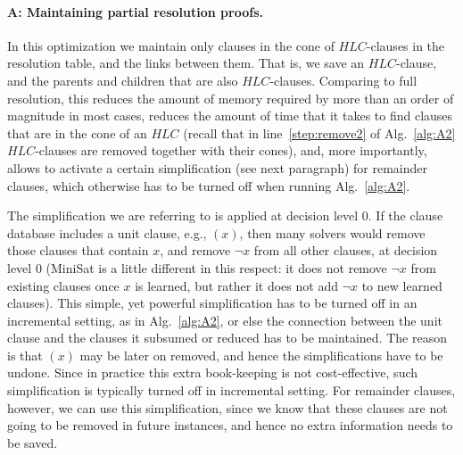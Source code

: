 \documentclass[twoside,11pt]{article}
\begin{document}
\paragraph{A: Maintaining partial resolution proofs.} In this optimization we maintain only clauses in the cone of $HLC$-clauses in the resolution table, and the links between them. That is, we save an $HLC$-clause, and the parents and children that are also $HLC$-clauses.
Comparing to full resolution, this reduces the amount of memory required by more than an order of magnitude in most cases, reduces the amount of time that it takes to find clauses that are in the cone of an $HLC$ (recall that in line~\ref{step:remove2} of Alg.~\ref{alg:A2} $HLC$-clauses are removed together with their cones), and, more importantly, allows to activate a certain simplification (see next paragraph) for remainder clauses, which otherwise has to be turned off when running Alg.~\ref{alg:A2}.

The simplification we are referring to is applied at decision level 0. If the clause database includes a unit clause, e.g., $(x)$, then
many solvers would remove those clauses that contain $x$, and remove $\lnot
x$ from all other clauses, at decision level 0 (MiniSat is a little different
in this respect: it does not remove $\lnot x$ from existing clauses once $x$
is learned, but rather it does not add $\lnot x$ to new learned clauses).
This simple, yet powerful simplification has to be turned off in an incremental setting, as in Alg.~\ref{alg:A2}, or else the connection between the unit clause and the clauses it subsumed or reduced has to be maintained. The reason is that $(x)$ may be later on removed, and hence the simplifications have to be undone. Since in practice this extra book-keeping is not cost-effective, such simplification is typically turned off in incremental setting. For remainder clauses, however, we can use this simplification, since we know that these clauses are not going to be removed in future instances, and hence no extra information needs to be saved.

\end{document}
